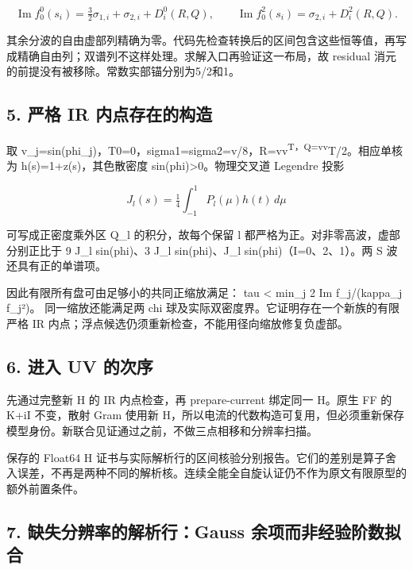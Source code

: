 \documentclass[
  10pt,
  a4paper,
]{article}
\begin{document}
\[
\operatorname{Im} f^0_0(s_i)=\tfrac32\sigma_{1,i}+\sigma_{2,i}+D^0_i(R,Q),
\qquad
\operatorname{Im} f^2_0(s_i)=\sigma_{2,i}+D^2_i(R,Q).
\]

其余分波的自由虚部列精确为零。代码先检查转换后的区间包含这些恒等值，再写成精确自由列；双谱列不这样处理。求解入口再验证这一布局，故
residual 消元的前提没有被移除。常数实部锚分别为5/2和1。

\subsection{5. 严格 IR
内点存在的构造}\label{ux4e25ux683c-ir-ux5185ux70b9ux5b58ux5728ux7684ux6784ux9020}

取
v\_j=sin(phi\_j)，T0=0，sigma1=sigma2=v/8，R=vv\textsuperscript{T，Q=vv}T/2。相应单核为
h(s)=1+z(s)，其色散密度 sin(phi)\textgreater0。物理交叉道 Legendre 投影

\[
J_l(s)=\tfrac14\int_{-1}^1 P_l(\mu)h(t)\,d\mu
\]

可写成正密度乘外区 Q\_l 的积分，故每个保留 l
都严格为正。对非零高波，虚部分别正比于 9 J\_l sin(phi)、3 J\_l
sin(phi)、J\_l sin(phi)（I=0、2、1）。两 S 波还具有正的单谱项。

因此有限所有盘可由足够小的共同正缩放满足： tau \textless{} min\_j 2 Im
f\_j/(kappa\_j \textbar f\_j\textbar²)。 同一缩放还能满足两 chi
球及实际双密度界。它证明存在一个新族的有限严格 IR
内点；浮点候选仍须重新检查，不能用径向缩放修复负虚部。

\subsection{6. 进入 UV 的次序}\label{ux8fdbux5165-uv-ux7684ux6b21ux5e8f}

先通过完整新 H 的 IR 内点检查，再 prepare-current 绑定同一 H。原生 FF 的
K+iI 不变，散射 Gram 使用新
H，所以电流的代数构造可复用，但必须重新保存模型身份。新联合见证通过之前，不做三点相移和分辨率扫描。

保存的 Float64 H
证书与实际解析行的区间核验分别报告。它们的差别是算子舍入误差，不再是两种不同的解析核。连续全能全自旋认证仍不作为原文有限原型的额外前置条件。

\subsection{7. 缺失分辨率的解析行：Gauss
余项而非经验阶数拟合}\label{ux7f3aux5931ux5206ux8fa8ux7387ux7684ux89e3ux6790ux884cgauss-ux4f59ux9879ux800cux975eux7ecfux9a8cux9636ux6570ux62dfux5408}
\end{document}
